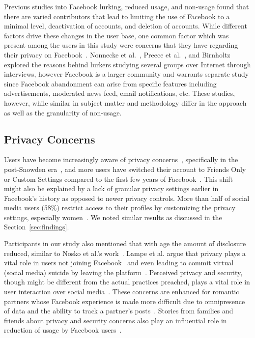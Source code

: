 Previous studies into Facebook lurking, reduced usage, and non-usage found that there are varied contributors that lead to limiting the use of Facebook to a minimal level, deactivation of accounts, and deletion of accounts. While different factors drive these changes in the user base, one common factor which was present among the users in this study were concerns that they have regarding their privacy on Facebook~\cite{baumer2013limiting}. Nonnecke et al.~\cite{nonnecke2001lurkers}, Preece et al.~\cite{preece2004top}, and Birnholtz~\cite{birnholtz2010adopt} explored the reasons behind lurkers studying several groups over Internet through interviews, however Facebook is a larger community and warrants separate study since Facebook abandonment can arise from specific features including advertisements, moderated news feed, email notifications, etc. These studies, however, while similar in subject matter and methodology differ in the approach as well as the granularity of non-usage. 

\subsection{Privacy Concerns}
Users have become increasingly aware of privacy concerns~\cite{hargittai2010facebook}, specifically in the post-Snowden era~\cite{rainie2015americans}, and more users have switched their account to Friends Only or Custom Settings compared to the first few years of Facebook~\cite{fuchs2012political,madden2012privacy}. This shift might also be explained by a lack of granular privacy settings earlier in Facebook's history as opposed to newer privacy controls. More than half of social media users (58\%) restrict access to their profiles by customizing the privacy settings, especially women~\cite{madden2012privacy}. We noted similar results as discussed in the Section~\ref{sec:findings}.

Participants in our study also mentioned that with age the amount of disclosure reduced, similar to Nosko et al.'s work~\cite{nosko2010all}. Lampe et al. argue that privacy plays a vital role in users not joining Facebook~\cite{lampe2013users} and even leading to commit virtual (social media) suicide by leaving the platform~\cite{stieger2013commits}. Perceived privacy and security, though might be different from the actual practices preached, plays a vital role in user interaction over social media~\cite{jung2016imagined,shin2010effects,debatin2009facebook,liu2011analyzing}. These concerns are enhanced for romantic partners whose Facebook experience is made more difficult due to  omnipresence of data and the ability to track a partner's posts~\cite{gershon2011friend,madden2006online,zhao2012s}. Stories from families and friends about privacy and security concerns also play an influential role in reduction of usage by Facebook users~\cite{rader2012stories}. 

